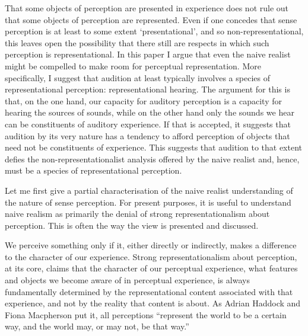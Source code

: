 \documentclass[sloppy, journal, git, bytitle, dodraft]{humapap}
\begin{document}
That some objects of perception are presented in experience does not rule out that some objects of perception are represented. Even if one concedes that sense perception is at least to some extent `presentational', and so non-representational, this leaves open the possibility that there still are respects in which such perception is representational.  In this paper I argue that even the naive realist might be compelled to make room for perceptual representation. More specifically, I suggest that audition at least typically involves a species of representational perception: representational hearing. The argument for this is that,  on the one hand, our capacity for auditory perception is a capacity for hearing the sources of sounds, while on the other hand only the sounds we hear can be constituents of auditory experience. If that is accepted, it suggests that audition by its very nature has a tendency to afford perception of objects that need not be constituents of experience. This suggests that audition to that extent defies the non-representationalist analysis offered by the naive realist and, hence, must be a species of representational perception.  

\sect Let me first give a partial characterisation of the naive realist understanding of the nature of sense perception. For present purposes, it is useful to understand naive realism as primarily the denial of strong representationalism about perception. This is often the way the view is presented and discussed. 

We perceive something only if it, either directly or indirectly, makes a difference to the character of our experience.  Strong representationalism about perception, at its core, claims that the character of our perceptual experience, what features and objects we become aware of in perceptual experience, is always fundamentally determined by the representational content associated with that experience, and not by the reality that content is about. As Adrian Haddock and Fiona Macpherson put it, all perceptions ``represent the world to be a certain way, and the world may, or may not, be that way.''\autocite[p. 14]{haddock2008aa}
\end{document}
